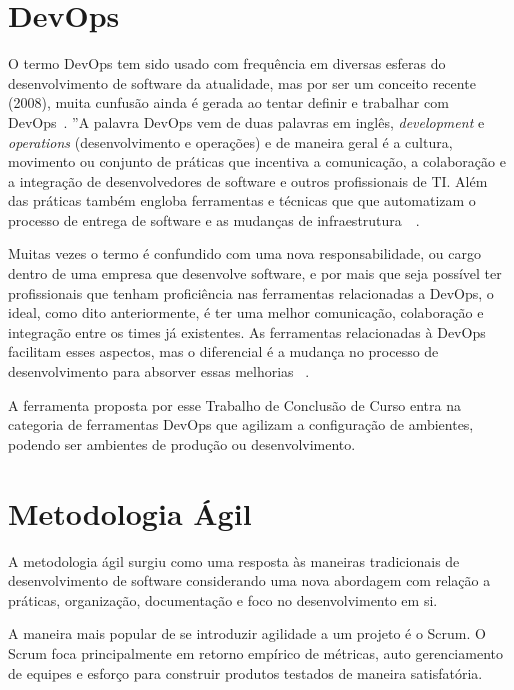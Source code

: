\section{DevOps}
\label{sec:devops}

O termo DevOps tem sido usado com frequência em diversas esferas do
desenvolvimento de software da atualidade, mas por ser um conceito recente
(2008), muita cunfusão ainda é gerada ao tentar definir e trabalhar com
DevOps~\cite{adambertram:2016}. ''A palavra DevOps vem de duas palavras em
inglês, \textit{development} e \textit{operations} (desenvolvimento e operações) e de maneira
geral é a cultura, movimento ou conjunto de práticas que incentiva
a comunicação, a colaboração e a integração de desenvolvedores de software
e outros profissionais de TI. Além das práticas também engloba ferramentas
e técnicas que que automatizam o processo de entrega de software e as mudanças
de infraestrutura~\cite{loukides2012devops}~\cite{erich2014mapping}.

Muitas vezes o termo é confundido com uma nova responsabilidade, ou cargo
dentro de uma empresa que desenvolve software, e por mais que seja possível
ter profissionais que tenham proficiência nas ferramentas relacionadas a
DevOps, o ideal, como dito anteriormente, é ter uma melhor comunicação,
colaboração e integração entre os times já existentes. As ferramentas
relacionadas à DevOps facilitam esses aspectos, mas o diferencial é a
mudança no processo de desenvolvimento para absorver essas melhorias
~\cite{adambertram:2016}.

A ferramenta proposta por esse Trabalho de Conclusão de Curso entra na categoria
de ferramentas DevOps que agilizam a configuração de ambientes, podendo ser ambientes
de produção ou desenvolvimento.


\section{Metodologia Ágil}

A metodologia ágil surgiu como uma resposta às maneiras tradicionais de desenvolvimento
de software considerando uma nova abordagem com relação a práticas, organização,
documentação e foco no desenvolvimento em si.~\cite{agilemetorg:2016}

A maneira mais popular de se introduzir agilidade a um projeto é o Scrum. O Scrum
foca principalmente em retorno empírico de métricas, auto gerenciamento de
equipes e esforço para construir produtos testados de maneira 
satisfatória.~\cite{agilemetorg:2016}

